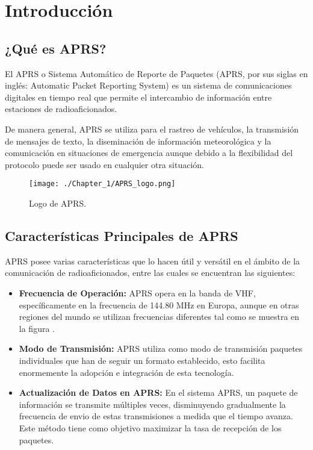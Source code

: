 \titlespacing*{\chapter}{0pt}{-1.25cm}{25pt}
\chapter{Introducción}
\section{¿Qué es APRS?}

El APRS o Sistema Automático de Reporte de Paquetes (APRS, por sus siglas en inglés: Automatic Packet Reporting System) es un sistema de comunicaciones digitales en tiempo real que permite el intercambio de información entre estaciones de radioaficionados.

De manera general, APRS se utiliza para el rastreo de vehículos, la transmisión de mensajes de texto, la diseminación de información meteorológica y la comunicación en situaciones de emergencia aunque debido a la flexibilidad del protocolo puede ser usado en cualquier otra situación.

\begin{figure}[h!]
	\centering
	\texttt{[image: ./Chapter\_1/APRS\_logo.png]}
	\caption{Logo de APRS.}
	\label{fig:aprs-logo}
\end{figure}

\section{Características Principales de APRS}

APRS posee varias características que lo hacen útil y versátil en el ámbito de la comunicación de radioaficionados, entre las cuales se encuentran las siguientes:
\begin{itemize}
	\item \textbf{Frecuencia de Operación:} APRS opera en la banda de VHF, específicamente en la frecuencia de 144.80 MHz en Europa, aunque en otras regiones del mundo se utilizan frecuencias diferentes tal como se muestra en la figura .
	\item \textbf{Modo de Transmisión:} APRS utiliza como modo de transmisión paquetes individuales que han de seguir un formato establecido, esto facilita enormemente la adopción e integración de esta tecnología.
	\item \textbf{Actualización de Datos en APRS:} En el sistema APRS, un paquete de información se transmite múltiples veces, disminuyendo gradualmente la frecuencia de envio de estas transmisiones a medida que el tiempo avanza. Este método tiene como objetivo maximizar la tasa de recepción de los paquetes.
\end{itemize}

